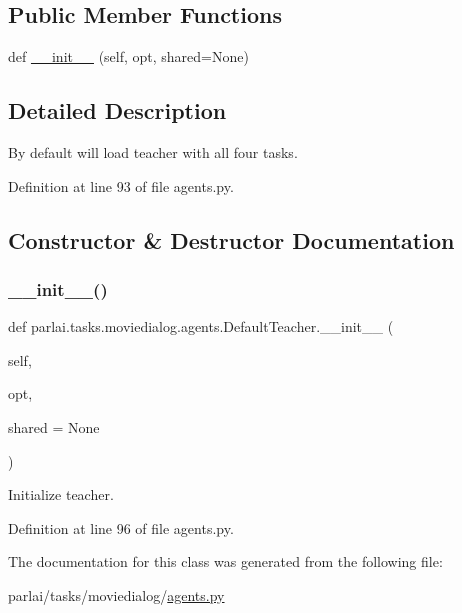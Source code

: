 \subsection*{Public Member Functions}
\begin{DoxyCompactItemize}
\item 
def \hyperlink{classparlai_1_1tasks_1_1moviedialog_1_1agents_1_1DefaultTeacher_a80e2f5fa10d6a6d884fca5ca97fe2e29}{\+\_\+\+\_\+init\+\_\+\+\_\+} (self, opt, shared=None)
\end{DoxyCompactItemize}


\subsection{Detailed Description}
\begin{DoxyVerb}By default will load teacher with all four tasks.\end{DoxyVerb}
 

Definition at line 93 of file agents.\+py.



\subsection{Constructor \& Destructor Documentation}
\mbox{\label{classparlai_1_1tasks_1_1moviedialog_1_1agents_1_1DefaultTeacher_a80e2f5fa10d6a6d884fca5ca97fe2e29}} 
\subsubsection{\texorpdfstring{\+\_\+\+\_\+init\+\_\+\+\_\+()}{\_\_init\_\_()}}
{\footnotesize\ttfamily def parlai.\+tasks.\+moviedialog.\+agents.\+Default\+Teacher.\+\_\+\+\_\+init\+\_\+\+\_\+ (\begin{DoxyParamCaption}\item[{}]{self,  }\item[{}]{opt,  }\item[{}]{shared = {\ttfamily None} }\end{DoxyParamCaption})}

\begin{DoxyVerb}Initialize teacher.\end{DoxyVerb}
 

Definition at line 96 of file agents.\+py.



The documentation for this class was generated from the following file\+:\begin{DoxyCompactItemize}
\item 
parlai/tasks/moviedialog/\hyperlink{parlai_2tasks_2moviedialog_2agents_8py}{agents.\+py}\end{DoxyCompactItemize}
